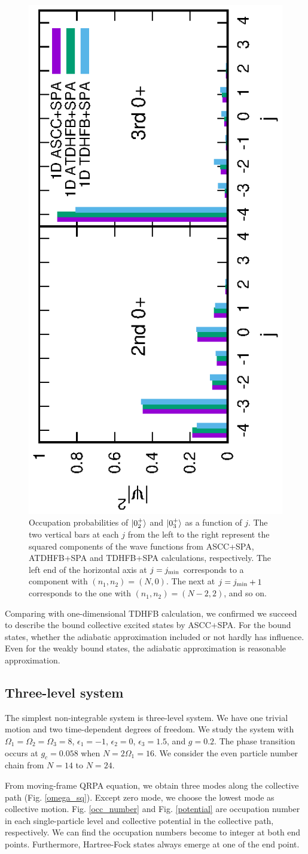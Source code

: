\documentclass[%
superscriptaddress,
showpacs,
nofootinbib,
amsmath,amssymb,
aps,
prc,
twocolumn,
floatfix ]%
{revtex4-1}
\begin{document}
\begin{figure}[thb]
 \begin{center}
   \includegraphics[height=0.5\textwidth,angle=-90]{N16X3p2occ.eps}
 \end{center}
	\caption{Occupation probabilities of $\ket{0_2^+}$ and $\ket{0_3^+}$
as a function of $j$.
The two vertical bars at each $j$ from the left to the right represent
the squared components of the wave functions
from ASCC+SPA, ATDHFB+SPA and TDHFB+SPA calculations, respectively.
The left end of the horizontal axis at $j=j_{\rm min}$
corresponds to a component with $(n_1,n_2)=(N,0)$.
The next at $j=j_{\rm min}+1$ corresponds to the one with
$(n_1,n_2)=(N-2,2)$, and so on.
}
 \label{fig:N16_occ}
\end{figure}


Comparing with one-dimensional TDHFB calculation, we confirmed we succeed to describe the bound collective excited states by ASCC+SPA. For the bound states, whether the adiabatic approximation included or not hardly has influence. Even for the weakly bound states, the adiabatic approximation is reasonable approximation.


\subsection{Three-level system}
The simplest non-integrable system is three-level system. We have one trivial motion and two time-dependent degrees of freedom. We study the system with $\Omega_1=\Omega_2=\Omega_3=8$, $\epsilon_1=-1$, $\epsilon_2=0$, $\epsilon_3=1.5$, and $g=0.2$. The phase transition occurs at $g_c=0.058$ when $N=2\Omega_1=16$. We consider the even particle number chain from $N=14$ to $N=24$. 

From moving-frame QRPA equation, we obtain three modes along the collective path (Fig. \ref{omega_sq}). Except zero mode, we choose the lowest mode as collective motion. Fig. \ref{occ_number} and Fig. \ref{potential} are occupation number in each single-particle level and collective potential in the collective path, respectively. We can find the occupation numbers become to integer at both end points. Furthermore, Hartree-Fock states always emerge at one of the end point. 
\end{document}
